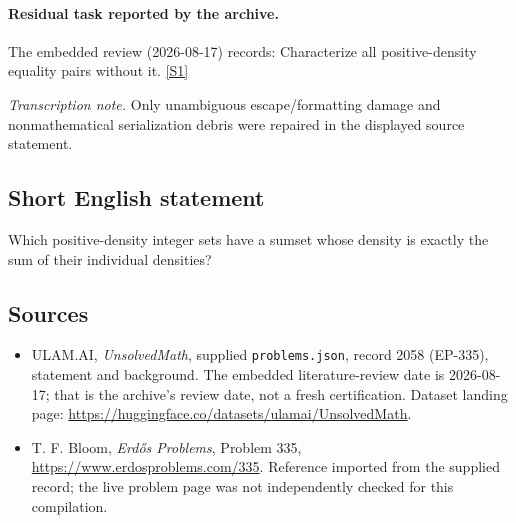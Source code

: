 \documentclass[11pt,a4paper]{article}
\newcommand{\sref}[2]{\hyperlink{source:#1:#2}{[S#2]}}
\begin{document}
\paragraph{Residual task reported by the archive.}

The embedded review (2026-08-17) records: Characterize all positive-density equality pairs without it. \sref{2058}{1}

{\small\emph{Transcription note.} Only unambiguous escape/formatting damage and nonmathematical serialization debris were repaired in the displayed source statement.}

\subsection{Short English statement}

Which positive-density integer sets have a sumset whose density is exactly the sum of their individual densities?

\subsection{Sources}

{\small

\begin{itemize}

\item[\hypertarget{source:2058:1}{S1}] ULAM.AI, \emph{UnsolvedMath}, supplied \texttt{problems.json}, record 2058 (EP-335), statement and background. The embedded literature-review date is 2026-08-17; that is the archive’s review date, not a fresh certification. Dataset landing page: \url{https://huggingface.co/datasets/ulamai/UnsolvedMath}.

\item[\hypertarget{source:2058:2}{S2}] T. F. Bloom, \emph{Erdős Problems}, Problem 335, \url{https://www.erdosproblems.com/335}. Reference imported from the supplied record; the live problem page was not independently checked for this compilation.

\end{itemize}

}

\label{end:2058}
\end{document}
